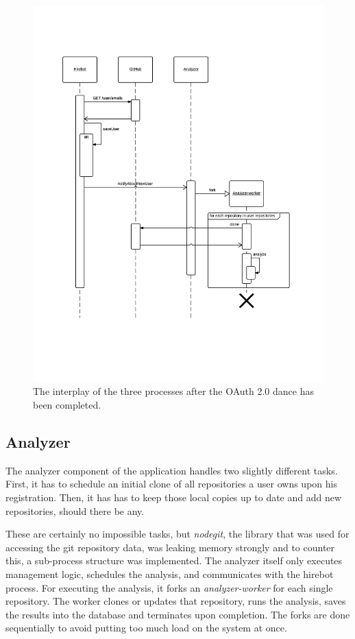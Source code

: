 \begin{figure}
  \centering
  \includegraphics[width=35em]{gfx/registersequence.png}
  \caption{The interplay of the three processes after the OAuth 2.0 dance has been completed.}
  \label{fig:regprocess}
\end{figure}

\subsection{Analyzer}
The analyzer component of the application handles two slightly different
tasks. First, it has to schedule an initial clone of all repositories
a user owns upon his registration. Then, it has has to keep those local
copies up to date and add new repositories, should there be any.
\newline

These are certainly no impossible tasks, but \textit{nodegit}, the library
that was used for accessing the git repository data, was
leaking memory strongly and to counter this, a sub-process structure was
implemented. The analyzer itself only executes management logic,
schedules the analysis, and communicates with the hirebot process.
For executing the analysis, it forks an \textit{analyzer-worker} for each
single repository. The worker clones or updates that repository,
runs the analysis, saves the results into the database and terminates
upon completion. The forks are done sequentially to avoid putting
too much load on the system at once.

